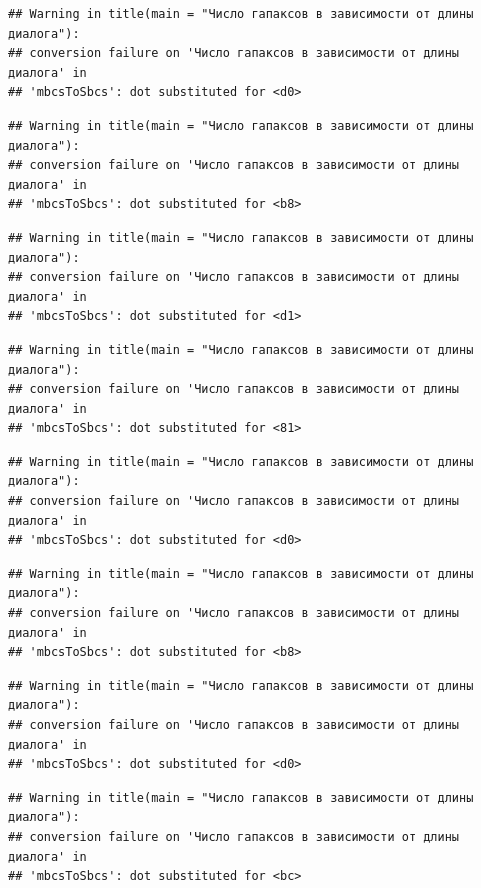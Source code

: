 \documentclass[
]{book}
\theoremstyle{definition}
\theoremstyle{definition}
\theoremstyle{definition}
\theoremstyle{definition}
\theoremstyle{remark}
\begin{document}
\begin{verbatim}
## Warning in title(main = "Число гапаксов в зависимости от длины диалога"):
## conversion failure on 'Число гапаксов в зависимости от длины диалога' in
## 'mbcsToSbcs': dot substituted for <d0>
\end{verbatim}

\begin{verbatim}
## Warning in title(main = "Число гапаксов в зависимости от длины диалога"):
## conversion failure on 'Число гапаксов в зависимости от длины диалога' in
## 'mbcsToSbcs': dot substituted for <b8>
\end{verbatim}

\begin{verbatim}
## Warning in title(main = "Число гапаксов в зависимости от длины диалога"):
## conversion failure on 'Число гапаксов в зависимости от длины диалога' in
## 'mbcsToSbcs': dot substituted for <d1>
\end{verbatim}

\begin{verbatim}
## Warning in title(main = "Число гапаксов в зависимости от длины диалога"):
## conversion failure on 'Число гапаксов в зависимости от длины диалога' in
## 'mbcsToSbcs': dot substituted for <81>
\end{verbatim}

\begin{verbatim}
## Warning in title(main = "Число гапаксов в зависимости от длины диалога"):
## conversion failure on 'Число гапаксов в зависимости от длины диалога' in
## 'mbcsToSbcs': dot substituted for <d0>
\end{verbatim}

\begin{verbatim}
## Warning in title(main = "Число гапаксов в зависимости от длины диалога"):
## conversion failure on 'Число гапаксов в зависимости от длины диалога' in
## 'mbcsToSbcs': dot substituted for <b8>
\end{verbatim}

\begin{verbatim}
## Warning in title(main = "Число гапаксов в зависимости от длины диалога"):
## conversion failure on 'Число гапаксов в зависимости от длины диалога' in
## 'mbcsToSbcs': dot substituted for <d0>
\end{verbatim}

\begin{verbatim}
## Warning in title(main = "Число гапаксов в зависимости от длины диалога"):
## conversion failure on 'Число гапаксов в зависимости от длины диалога' in
## 'mbcsToSbcs': dot substituted for <bc>
\end{verbatim}
\end{document}
